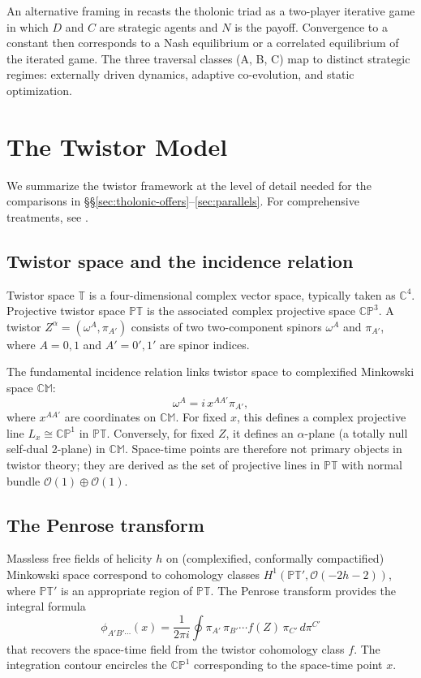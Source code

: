 \documentclass[12pt]{article}
\begin{document}
An alternative framing in \cite{Mil26c} recasts the tholonic triad as a two-player
iterative game in which $D$ and $C$ are strategic agents and $N$ is the payoff.
Convergence to a constant then corresponds to a Nash equilibrium or a correlated
equilibrium of the iterated game.  The three traversal classes (A, B, C) map to
distinct strategic regimes: externally driven dynamics, adaptive co-evolution, and
static optimization.

\section{The Twistor Model}\label{sec:twistor}

We summarize the twistor framework at the level of detail needed for the comparisons in
\S\S\ref{sec:tholonic-offers}--\ref{sec:parallels}.  For comprehensive treatments, see
\cite{PR86,ADM17,WW90}.

\subsection{Twistor space and the incidence relation}\label{sec:incidence}

Twistor space $\mathbb{T}$ is a four-dimensional complex vector space, typically taken
as $\mathbb{C}^4$.  Projective twistor space $\mathbb{PT}$ is the associated complex
projective space $\mathbb{CP}^3$.  A twistor $Z^\alpha = (\omega^A, \pi_{A'})$ consists
of two two-component spinors $\omega^A$ and $\pi_{A'}$, where $A = 0, 1$ and
$A' = 0', 1'$ are spinor indices.

The fundamental incidence relation links twistor space to complexified Minkowski space
$\mathbb{CM}$:
\[
  \omega^A = i\, x^{AA'} \pi_{A'},
\]
where $x^{AA'}$ are coordinates on $\mathbb{CM}$.  For fixed $x$, this defines a
complex projective line $L_x \cong \mathbb{CP}^1$ in $\mathbb{PT}$.  Conversely, for
fixed $Z$, it defines an $\alpha$-plane (a totally null self-dual 2-plane) in
$\mathbb{CM}$.  Space-time points are therefore not primary objects in twistor theory;
they are derived as the set of projective lines in $\mathbb{PT}$ with normal bundle
$\mathcal{O}(1) \oplus \mathcal{O}(1)$.

\subsection{The Penrose transform}\label{sec:penrose-transform}

Massless free fields of helicity $h$ on (complexified, conformally compactified)
Minkowski space correspond to cohomology classes
$H^1(\mathbb{PT}', \mathcal{O}(-2h-2))$, where $\mathbb{PT}'$ is an appropriate region
of $\mathbb{PT}$.  The Penrose transform provides the integral formula
\[
  \phi_{A'B'\cdots}(x) = \frac{1}{2\pi i}
  \oint \pi_{A'}\,\pi_{B'}\cdots f(Z)\,\pi_{C'}\,d\pi^{C'}
\]
that recovers the space-time field from the twistor cohomology class $f$.  The
integration contour encircles the $\mathbb{CP}^1$ corresponding to the space-time
point $x$.
\end{document}
